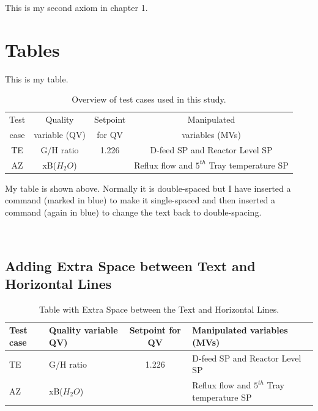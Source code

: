 \begin{axiom}
This is my second axiom in chapter 1.
\end{axiom}

\section{Tables}

This is my table.

\renewcommand{\baselinestretch}{1}
\small\normalsize

\begin{table}[h]
\caption[Short title]{Overview of test cases used in this study.}
\begin{center}
\begin{tabular}{|c|c|c|c|}
\hline
Test & Quality & Setpoint & Manipulated \\
case & variable (QV) & for QV & variables (MVs)\\
\hline \hline
TE & G/H ratio & 1.226 & D-feed SP and Reactor Level SP\\
AZ & xB($H_2O$) & & Reflux flow and $5^{th}$ Tray temperature SP\\
\hline
\end{tabular}
\end{center}
\label{test_over1}
\end{table}

\renewcommand{\baselinestretch}{2}
\small\normalsize

My table is shown above.   Normally it is double-spaced but I have inserted a command (marked in blue) to make it single-spaced and then inserted a command (again in blue) to change the text back to double-spacing.

\

\subsection{Adding Extra Space between Text and Horizontal Lines}

\renewcommand{\baselinestretch}{1}
\small\normalsize

\setlength{\tablinesep}{5ex}

\begin{table}[h]
\caption{Table with Extra Space between the Text and Horizontal Lines.}
\begin{center}
\begin{tabular}{|p{.5in}|p{1in}|c|p{2.25in}|}
\hline
Test case& Quality variable QV)& Setpoint for QV & Manipulated  variables (MVs)\\
\hline \hline
TE & G/H ratio & 1.226 & D-feed SP and Reactor Level SP\\ \hline
AZ & xB($H_2O$) & & Reflux flow and $5^{th}$ Tray temperature SP \\
\hline
\end{tabular}
\end{center}
\label{test_over2}
\end{table}


